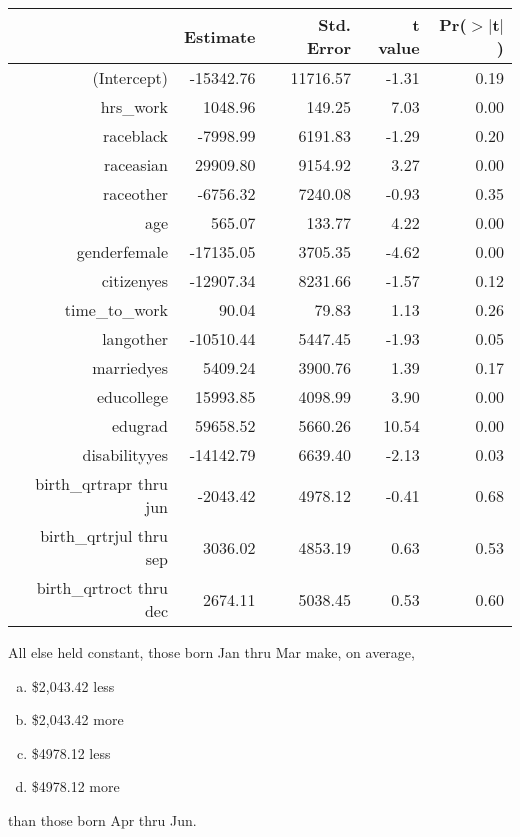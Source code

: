 \documentclass[slidestop,compress,mathserif,12pt,t,professionalfonts,xcolor=table]{beamer}
\newcommand{\solnMult}[1]{#1}
\begin{document}

\begin{frame}


\begin{center}
{\tiny
\begin{tabular}{rrrrr}
  \hline
 & Estimate & Std. Error & t value & Pr($>$$|$t$|$) \\ 
  \hline
(Intercept) & -15342.76 & 11716.57 & -1.31 & 0.19 \\ 
  hrs\_work & 1048.96 & 149.25 & 7.03 & 0.00 \\ 
  raceblack & -7998.99 & 6191.83 & -1.29 & 0.20 \\ 
  raceasian & 29909.80 & 9154.92 & 3.27 & 0.00 \\ 
  raceother & -6756.32 & 7240.08 & -0.93 & 0.35 \\ 
  age & 565.07 & 133.77 & 4.22 & 0.00 \\ 
  genderfemale & -17135.05 & 3705.35 & -4.62 & 0.00 \\ 
  citizenyes & -12907.34 & 8231.66 & -1.57 & 0.12 \\ 
  time\_to\_work & 90.04 & 79.83 & 1.13 & 0.26 \\ 
  langother & -10510.44 & 5447.45 & -1.93 & 0.05 \\ 
  marriedyes & 5409.24 & 3900.76 & 1.39 & 0.17 \\ 
  educollege & 15993.85 & 4098.99 & 3.90 & 0.00 \\ 
  edugrad & 59658.52 & 5660.26 & 10.54 & 0.00 \\ 
  disabilityyes & -14142.79 & 6639.40 & -2.13 & 0.03 \\ 
  birth\_qrtrapr thru jun & -2043.42 & 4978.12 & -0.41 & 0.68 \\ 
  birth\_qrtrjul thru sep & 3036.02 & 4853.19 & 0.63 & 0.53 \\ 
  birth\_qrtroct thru dec & 2674.11 & 5038.45 & 0.53 & 0.60 \\ 
   \hline
\end{tabular}
}
\end{center}

{\footnotesize
All else held constant, those born Jan thru Mar make, on average,
\begin{multicols}{4}
\begin{enumerate}[(a)]
\item \$2,043.42 less
\item \solnMult{\$2,043.42 more}
\item \$4978.12 less
\item \$4978.12 more
\end{enumerate}
\end{multicols}
\vspace{-0.5cm}
than those born Apr thru Jun.
}

\end{frame}
\end{document}
